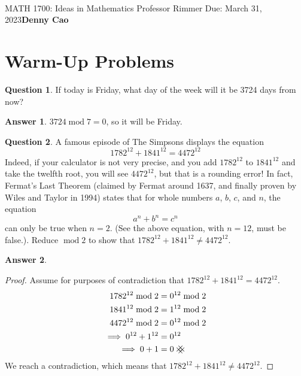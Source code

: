 \documentclass[article, 12pt]{article}
\title{\Large\bf{\psetName}}
\makeatletter
\theoremstyle{definition}
\newcommand{\courseNumber}{MATH 1700}
\newcommand{\courseName}{Ideas in Mathematics}
\newcommand{\professor}{Professor Rimmer}
\newcommand{\dueDate}{Due: March 31, 2023}
\newcommand{\name}{Denny Cao}
\newtheorem{question}{Question}
\newtheorem{answer}{Answer}
\newcommand{\Mod}[1]{\;\mathrm{mod}\; #1} %
\newcommand{\contradiction}{{\hbox{%
    \setbox0=\hbox{$\mkern-3mu\times\mkern-3mu$}%
    \setbox1=\hbox to0pt{\hss$\times$\hss}%
    \copy0\raisebox{0.5\wd0}{\copy1}\raisebox{-0.5\wd0}{\box1}\box0
}}}
\renewcommand{\maketitle}{\bgroup\setlength{\parindent}{0pt}
    \begin{flushleft}
        \textbf{\@title} \\ \vskip0.2cm
        \begingroup
            \fontsize{14pt}{12pt}\selectfont
            \courseNumber: \courseName 
            \vskip0.3cm 
            \professor
        \endgroup \vskip0.3cm
        \dueDate \hfill\rlap{}\bf{\name} \\ \vskip0.1cm
        \hrulefill
    \end{flushleft}\egroup 
}
\makeatother
\begin{document}
    \maketitle
    \thispagestyle{plain}
    \section{Warm-Up Problems}
    \begin{question}
        If today is Friday, what day of the week will it be 3724 days from now?
    \end{question} 
    \begin{answer}
        $3724\Mod{7} = 0$, so it will be Friday.
    \end{answer}
    \begin{question}
        A famous episode of The Simpsons displays the equation
        \[ 1782^{12} + 1841^{12} = 4472^{12} \]
        Indeed, if your calculator is not very precise, and you add $1782^{12}$ to $1841^{12}$ and take the twelfth root, you will see $4472^{12}$, but that is a rounding error! In fact, Fermat's Last Theorem (claimed by Fermat around 1637, and finally proven by Wiles and Taylor in 1994) states that for whole numbers $a$, $b$, $c$, and $n$, the equation
        \[ a^n + b^n = c^n \]
        can only be true when $n=2$. (See the above equation, with $n=12$, must be false.). Reduce $\Mod{2}$ to show that $1782^{12} + 1841^{12} \neq 4472^{12}$.
    \end{question}
    \begin{answer} \
        \begin{proof}
            Assume for purposes of contradiction that $1782^{12} + 1841^{12} = 4472^{12}$.
            \begin{align*}
                1782^{12} \Mod{2} &= 0^{12} \Mod{2} \\
                1841^{12} \Mod{2} &= 1^{12} \Mod{2} \\
                4472^{12} \Mod{2} &= 0^{12} \Mod{2} \\
                \implies 0^{12} + 1^{12} &= 0^{12} \\
                \implies 0 + 1 &= 0 \ \contradiction
            \end{align*}
            We reach a contradiction, which means that $1782^{12} + 1841^{12} \neq 4472^{12}$.
        \end{proof}
    \end{answer}
\end{document}
